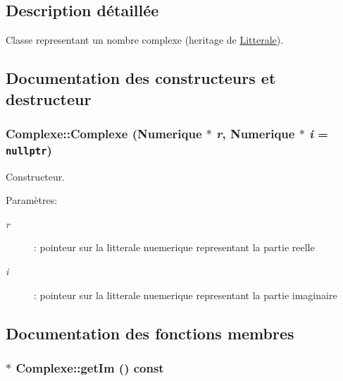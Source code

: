 \subsection{Description détaillée}
Classe representant un nombre complexe (heritage de \hyperlink{class_litterale}{Litterale}). 

\subsection{Documentation des constructeurs et destructeur}
\hypertarget{class_complexe_bef2deb54a211490612383ce80657cb6}{
\subsubsection[{Complexe}]{\setlength{\rightskip}{0pt plus 5cm}Complexe::Complexe ({\bf Numerique} $\ast$ {\em r}, \/  {\bf Numerique} $\ast$ {\em i} = {\tt nullptr})}}
\label{class_complexe_bef2deb54a211490612383ce80657cb6}


Constructeur. 

\begin{Desc}
\item[Paramètres:]
\begin{description}
\item[{\em r}]: pointeur sur la litterale nuemerique representant la partie reelle \item[{\em i}]: pointeur sur la litterale nuemerique representant la partie imaginaire \end{description}
\end{Desc}


\subsection{Documentation des fonctions membres}
\hypertarget{class_complexe_116626f10f871db6145b197e392f22dd}{
\subsubsection[{getIm}]{$\ast$ Complexe::getIm () const}}
\label{class_complexe_116626f10f871db6145b197e392f22dd}


